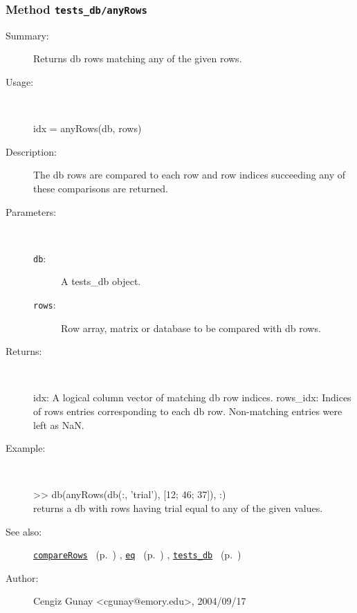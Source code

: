 \subsubsection[Method \texttt{anyRows}]{Method \texttt{tests\_db/anyRows}}%
%
\label{ref_tests_db__anyRows}%
\hypertarget{ref_tests_db__anyRows}{}%
\begin{description}
\item[Summary:]Returns db rows matching any of the given rows.
%
\item[Usage:]~%
\begin{lyxcode}%
idx = anyRows(db, rows)
%
\end{lyxcode}%
%
\item[Description:]%
The db rows are compared to each row and row indices succeeding any of
 these comparisons are returned.
\item[Parameters:]~
\begin{description}%
\item[\texttt{db}:]
 A tests\_db object.
\item[\texttt{rows}:]
 Row array, matrix or database to be compared with db rows.
\end{description}%
%
\item[Returns:
]~

	idx: A logical column vector of matching db row indices. 
	rows\_idx: Indices of rows entries corresponding to each db
		row. Non-matching entries were left as NaN.
%
\item[Example:]~
\begin{lyxcode}  >> db(anyRows(db(:, 'trial'), [12; 46; 37]), :)
\\%
 returns a db with rows having trial equal to any of the given values.
\\%
\end{lyxcode}
%
\item[See also:]%
\hyperlink{ref_compareRows}{\texttt{compareRows}}%
\ (p.~\pageref{ref_compareRows})%
%
, \hyperlink{ref_eq}{\texttt{eq}}%
\ (p.~\pageref{ref_eq})%
%
, \hyperlink{ref_tests_db}{\texttt{tests\_db}}%
\ (p.~\pageref{ref_tests_db})%
%
%
\item[Author:]%
Cengiz Gunay <cgunay@emory.edu>, 2004/09/17
%
\end{description}
\methodline%
